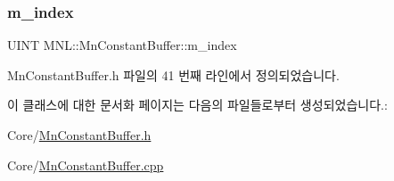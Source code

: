 \mbox{\label{class_m_n_l_1_1_mn_constant_buffer_a2ae6082ec83ef177993de6235b0030a1}} 
\subsubsection{\texorpdfstring{m\+\_\+index}{m\_index}}
{\footnotesize\ttfamily U\+I\+NT M\+N\+L\+::\+Mn\+Constant\+Buffer\+::m\+\_\+index\hspace{0.3cm}{\ttfamily [private]}}



Mn\+Constant\+Buffer.\+h 파일의 41 번째 라인에서 정의되었습니다.



이 클래스에 대한 문서화 페이지는 다음의 파일들로부터 생성되었습니다.\+:\begin{DoxyCompactItemize}
\item 
Core/\hyperlink{_mn_constant_buffer_8h}{Mn\+Constant\+Buffer.\+h}\item 
Core/\hyperlink{_mn_constant_buffer_8cpp}{Mn\+Constant\+Buffer.\+cpp}\end{DoxyCompactItemize}
